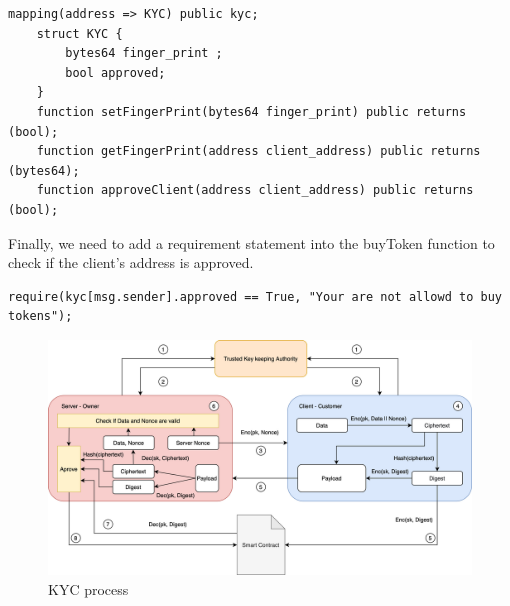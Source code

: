 \documentclass[12pt,a4paper]{article}
\begin{document}
\begin{lstlisting}[language=Solidity]
    mapping(address => KYC) public kyc;
    struct KYC {
        bytes64 finger_print ;
        bool approved;
    }
    function setFingerPrint(bytes64 finger_print) public returns (bool);
    function getFingerPrint(address client_address) public returns (bytes64);
    function approveClient(address client_address) public returns (bool);
\end{lstlisting}

Finally, we need to add a requirement statement into the buyToken function to
check if the client's address is approved.  \\

\begin{lstlisting}[language=Solidity]
    require(kyc[msg.sender].approved == True, "Your are not allowd to buy tokens");
\end{lstlisting}

\begin{figure}[htpb]
    \begin{center}
        \includegraphics[width=18cm]{kyc.png}
        \caption{KYC process}
        \label{fig:kyc-process}
    \end{center}
\end{figure} 
\end{document}
